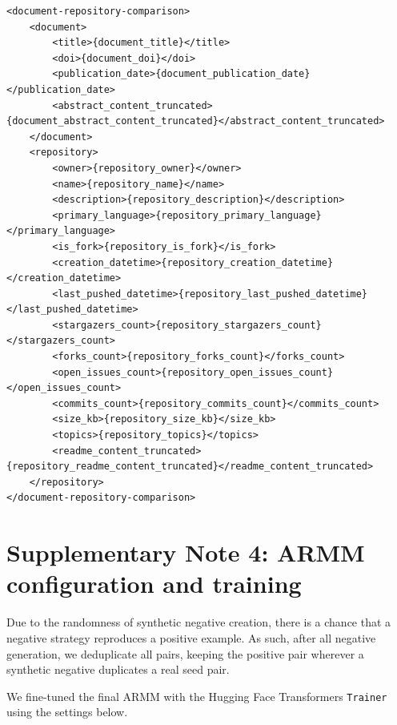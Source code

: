 \documentclass[pdflatex,sn-nature]{sn-jnl}%
\begin{document}
\begingroup
\makeatletter\def\verbatim@font{\normalfont\ttfamily\fontsize{6.8}{8.5}\selectfont}\makeatother
\begin{verbatim}
<document-repository-comparison>
    <document>
        <title>{document_title}</title>
        <doi>{document_doi}</doi>
        <publication_date>{document_publication_date}</publication_date>
        <abstract_content_truncated>{document_abstract_content_truncated}</abstract_content_truncated>
    </document>
    <repository>
        <owner>{repository_owner}</owner>
        <name>{repository_name}</name>
        <description>{repository_description}</description>
        <primary_language>{repository_primary_language}</primary_language>
        <is_fork>{repository_is_fork}</is_fork>
        <creation_datetime>{repository_creation_datetime}</creation_datetime>
        <last_pushed_datetime>{repository_last_pushed_datetime}</last_pushed_datetime>
        <stargazers_count>{repository_stargazers_count}</stargazers_count>
        <forks_count>{repository_forks_count}</forks_count>
        <open_issues_count>{repository_open_issues_count}</open_issues_count>
        <commits_count>{repository_commits_count}</commits_count>
        <size_kb>{repository_size_kb}</size_kb>
        <topics>{repository_topics}</topics>
        <readme_content_truncated>{repository_readme_content_truncated}</readme_content_truncated>
    </repository>
</document-repository-comparison>
\end{verbatim}
\endgroup

\section*{Supplementary Note 4: ARMM configuration and training}\label{snote:armmconfig}

Due to the randomness of synthetic negative creation, there is a chance that a negative strategy reproduces a positive example.
As such, after all negative generation, we deduplicate all pairs, keeping the positive pair wherever a synthetic negative duplicates a real seed pair.

We fine-tuned the final ARMM with the Hugging Face Transformers \texttt{Trainer} using the settings below.
\end{document}
